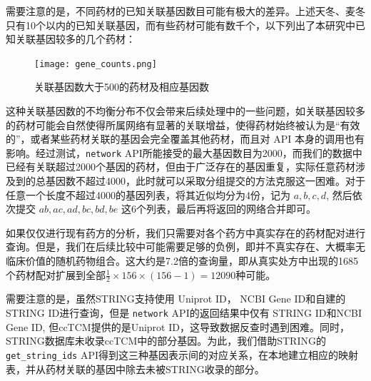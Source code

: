 需要注意的是，不同药材的已知关联基因数目可能有极大的差异。上述天冬、麦冬只有10个以内的已知关联基因，而有些药材可能有数千个，以下列出了本研究中已知关联基因较多的几个药材：

\begin{figure}[H]
  \centering
  \texttt{[image: gene\_counts.png]}
  \caption{关联基因数大于500的药材及相应基因数}
  \label{fig:top_genes}
\end{figure}

这种关联基因数的不均衡分布不仅会带来后续处理中的一些问题，如关联基因较多的药材可能会自然使得所属网络有显著的关联增益，使得药材始终被认为是“有效的”，或者某些药材关联的基因会完全覆盖其他药材，而且对 API 本身的调用也有影响。经过测试，\texttt{network} API所能接受的最大基因数目为2000，而我们的数据中已经有关联超过2000个基因的药材，但由于广泛存在的基因重复，实际任意药材涉及到的总基因数不超过4000，此时就可以采取分组提交的方法克服这一困难。对于任意一个长度不超过4000的基因列表，将其近似均分为4份，记为 $a, b, c, d$, 然后依次提交 $ab, ac, ad, bc, bd, be$ 这6个列表，最后再将返回的网络合并即可。

如果仅仅进行现有药方的分析，我们只需要对各个药方中真实存在的药材配对进行查询。但是，我们在后续比较中可能需要足够的负例，即并不真实存在、大概率无临床价值的随机药物组合。这大约是7.2倍的查询量，即从真实处方中出现的1685个药材配对扩展到全部$\frac{1}{2} \times 156 \times (156 - 1) = 12090$种可能。

需要注意的是，虽然STRING支持使用 Uniprot ID， NCBI Gene ID和自建的STRING ID进行查询，但是 \texttt{network} API的返回结果中仅有 STRING ID和NCBI Gene ID, 但ccTCM提供的是Uniprot ID，这导致数据反查时遇到困难。同时，STRING数据库未收录ccTCM中的部分基因。为此，我们借助STRING的\texttt{get\_string\_ids} API得到这三种基因表示间的对应关系，在本地建立相应的映射表，并从药材关联的基因中除去未被STRING收录的部分。